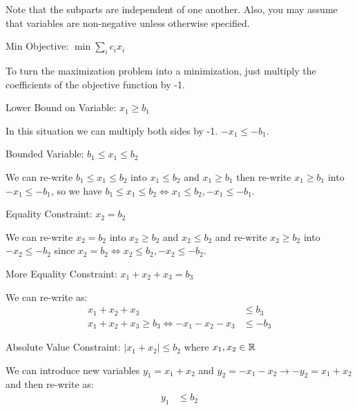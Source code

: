 \documentclass[11pt]{article}
\begin{document}
Note that the subparts are independent of one another. Also, you may assume that variables are non-negative unless otherwise specified.
\begin{subparts}
  \subpart Min Objective: $\min \sum_i c_i x_i$\\
  \begin{solution}
    To turn the maximization problem into a minimization, just multiply the coefficients of the objective function by -1.
  \end{solution}
  \subpart Lower Bound on Variable: $x_1 \geq b_1$\\
  \begin{solution}
    In this situation we can multiply both sides by -1. $-x_1 \le -b_1$.
  \end{solution}
  \subpart Bounded Variable: $b_1 \leq x_1 \leq b_2$\\
  \begin{solution}
    We can re-write $b_1 \leq x_1 \leq b_2$ into $x_1 \le b_2$ and $x_1 \geq b_1$ then re-write $x_1 \geq b_1$ into
    $-x_1 \le -b_1$, so we have $b_1 \leq x_1 \leq b_2 \Leftrightarrow x_1 \le b_2, -x_1 \le -b_1$. 
  \end{solution}
  \subpart Equality Constraint: $x_2 = b_2$\\
  \begin{solution}
    We can re-write $x_2 = b_2$ into $x_2 \geq b_2$ and $x_2 \le b_2$ and re-write $x_2 \geq b_2$ into
    $-x_2 \le -b_2$ since $x_2 = b_2 \Leftrightarrow x_2 \le b_2, -x_2 \le -b_2$.
  \newpage
  \end{solution}
  \subpart More Equality Constraint: $x_1 + x_2 + x_3 = b_3$\\
  \begin{solution}
    We can re-write as:
    \begin{align*}
       x_1 + x_2 + x_3 &\le b_3\\
       x_1 + x_2 + x_3 \geq b_3 \Leftrightarrow -x_1 - x_2 - x_3 &\le -b_3
    \end{align*}
  \end{solution}
  \subpart Absolute Value Constraint: $|x_1+x_2| \leq b_2$ where $x_1, x_2 \in \mathbb{R}$\\
  \begin{solution}
    We can introduce new variables $y_1 = x_1 + x_2$ and $y_2 = - x_1 - x_2 \rightarrow -y_2 = x_1 + x_2$ and then re-write as:
    \begin{align*}
        y_1 &\le b_2 \\

\end{align*}
\end{solution}
\end{subparts}
\end{document}
